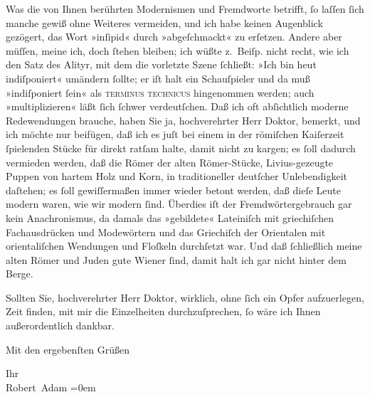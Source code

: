 \pstart
           Was die von Ihnen berührten Modernismen und Fremdworte betrifft, ſo laſſen ſich
               manche gewiß ohne Weiteres vermeiden, und ich habe keinen Augenblick gezögert, das
               Wort »inſipid« durch »abgeſchmackt« zu erſetzen. Andere aber müſſen, meine ich, doch
               ſtehen bleiben; ich wüßte z. Beiſp. nicht recht, wie ich den Satz des Alityr, mit dem
               die vorletzte Szene ſchließt: »Ich bin heut indiſponiert« umändern ſollte; er iſt
               halt ein Schauſpieler und da muß »indiſponiert ſein« als \textsc{terminus technicus} hingenommen werden; auch »multiplizieren« läßt ſich
               ſchwer verdeutſchen. Daß ich oft abſichtlich moderne Redewendungen brauche, haben Sie
               ja, hochverehrter Herr Doktor, be{\pb}merkt,
               und ich möchte nur beifügen, daß ich es juſt bei einem in der römiſchen Kaiſerzeit ſpielenden Stücke für direkt ratſam halte,
               damit nicht zu kargen; es ſoll dadurch vermieden werden, daß die Römer der alten Römer-Stücke, Livius-gezeugte Puppen von
               hartem Holz und Korn, in traditioneller deutſcher Unlebendigkeit daſtehen; es ſoll
               gewiſſermaßen immer wieder betont werden, daß dieſe Leute modern waren, wie wir
               modern ſind. Überdies iſt der Fremdwörtergebrauch gar kein Anachronismus, da damals
               das »gebildete« Lateiniſch mit griechiſchen
               Fachausdrücken und Modewörtern und das Griechiſch der Orientalen mit orientaliſchen Wendungen und Floſkeln
               durchſetzt war. Und daß ſchließlich meine alten Römer und Juden gute Wiener ſind, damit
               halt ich gar nicht hinter dem Berge.\pend
           
\pstart
           Sollten Sie, hochverehrter Herr Doktor, wirklich, ohne ſich ein Opfer aufzuerlegen,
               Zeit finden, mit mir die Einzelheiten durchzuſprechen, ſo wäre ich Ihnen
               außerordentlich dankbar.\pend
           
\pstart
           Mit den ergebenſten Grüßen\pend
           
\pstart
           Ihr{\\[\baselineskip]}\spacefill\mbox{Robert Adam}\pend
           \leftskip=0em{}\endnumbering{}  
      